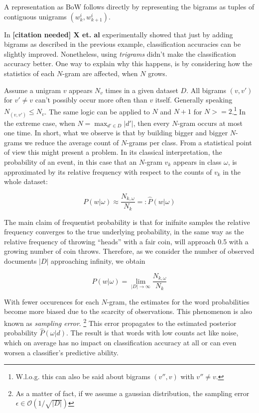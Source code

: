 A representation as BoW follows directly by representing the bigrams as
tuples of contiguous unigrams $(w_k^i, w_{k+1}^i)$. 

In \textbf{[citation needed] X et. al} experimentally showed that just by adding
bigrams as described in the previous example, classification accuracies can be
slightly improved.
Nonetheless, using \textit{trigrams} didn't make the classification accuracy better. 
One way to explain why this happens, is by considering how the
statistics of each $N$-gram are affected, when $N$ grows.
 
Assume a unigram $v$ appears $N_v$ times in a given dataset $D$. All bigrams
$(v,v')$ for $v' \neq v$ can't possibly occur more often than  $v$ itself.
Generally speaking $N_{(v,v')} \leq N_v$. 
The same logic can be applied to $N$ and $N+1$ for $N >= 2$.\footnote{W.l.o.g.
this can also be said about bigrams $(v'',v)$ with $v'' \neq v$.} In the
extreme case, when $N = \max_{d' \in D} |d'|$, then every $N$-gram occurs at most one time. In short,
what we observe is that by building bigger and bigger $N$-grams we reduce the 
average count of $N$-grams per class. From a statistical point of view this
might present a problem. In its classical interpretation, the probability of an event, 
in this case that an 
$N$-gram $v_k$ appears in class $\omega$, is approximated by
its relative frequency with respect to the counts of $v_k$ in the whole dataset: 

\begin{equation}
	P(w|\omega) \approx \frac{N_{k,\omega}}{N_k} =:
	\hat{P}(w|\omega)
\end{equation}

The main claim of frequentist probability is that for inifnite samples the
relative frequency converges to the true underlying probability, in the same 
way as the relative frequency of throwing ``heads'' with a fair coin, will
approach 0.5 with a growing number of coin throws. Therefore, as we consider the
number of observed documents $|D|$ approaching infinity, we obtain 

\begin{equation}
	P(w|\omega) = \lim_{|D| \to \infty} \frac{N_{k,\omega}}{N_k}
\end{equation}

With fewer occurences for each $N$-gram, the estimates for the word probabilities
become more biased due to the scarcity of observations. This phenomenon is also
known as \emph{sampling error}. \footnote{As a matter of fact, if we assume a
gaussian distribution, the sampling error $\epsilon \in
\mathcal{O}(1/\sqrt{|D|})$} This error propagates to the estimated posterior probability $\hat{P}(\omega|d)$. 
The result is that words with low counts act like noise, which on average has no
impact on classification accuracy at all or can even worsen a classifier's
predictive ability.
 
